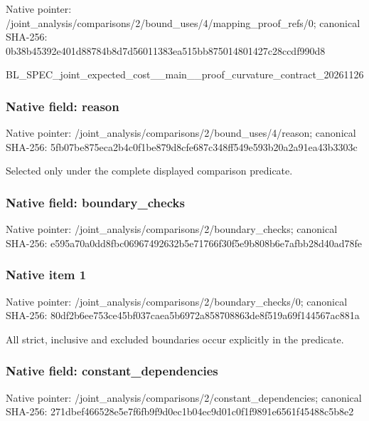 \documentclass[10pt,a4paper]{article}
\begin{document}
Native pointer: /joint\_analysis/comparis\allowbreak{}ons/2/bound\_uses/4/mappi\allowbreak{}ng\_proof\_refs/0; canonical SHA-256: 0b38b45392e401d88784b8d7\allowbreak{}d56011383ea515bb87501480\allowbreak{}1427c28ccdf990d8


BL\_SPEC\_joint\_expected\_c\allowbreak{}ost\_\_main\_\_proof\_curvatu\allowbreak{}re\_contract\_20261126


\subsubsection{Native field: reason}


Native pointer: /joint\_analysis/comparis\allowbreak{}ons/2/bound\_uses/4/reaso\allowbreak{}n; canonical SHA-256: 5fb07be875eca2b4c0f1be87\allowbreak{}9d8cfe687c348ff549e593b2\allowbreak{}0a2a91ea43b3303c


Selected only under the complete displayed comparison predicate.


\subsubsection{Native field: boundary\_checks}


Native pointer: /joint\_analysis/comparis\allowbreak{}ons/2/boundary\_checks; canonical SHA-256: e595a70a0dd8fbc069674926\allowbreak{}32b5e71766f30f5e9b808b6e\allowbreak{}7afbb28d40ad78fe



\subsubsection{Native item 1}


Native pointer: /joint\_analysis/comparis\allowbreak{}ons/2/boundary\_checks/0; canonical SHA-256: 80df2b6ee753ce45bf037cae\allowbreak{}a5b6972a858708863de8f519\allowbreak{}a69f144567ac881a


All strict, inclusive and excluded boundaries occur explicitly in the predicate.


\subsubsection{Native field: constant\_dependencies}


Native pointer: /joint\_analysis/comparis\allowbreak{}ons/2/constant\_dependenc\allowbreak{}ies; canonical SHA-256: 271dbef466528e5e7f6fb9f9\allowbreak{}d0ec1b04ec9d01c0f1f9891e\allowbreak{}6561f45488c5b8e2
\end{document}
